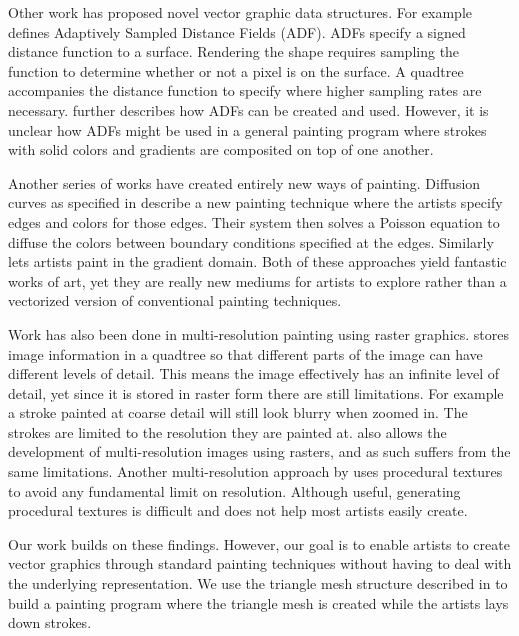 \documentclass[conference]{acmsiggraph}
\begin{document}
Other work has proposed novel vector graphic data structures. For example \cite{Frisken:2000:ASD:344779.344899}
defines Adaptively Sampled Distance Fields (ADF). ADFs specify a signed distance function to a surface.
Rendering the shape requires sampling the function to determine whether or not a pixel is on the surface.
A quadtree accompanies the distance function to specify where higher sampling rates are necessary. \cite{Bremer:2001:VCM}
further describes how ADFs can be created and used. However, it is unclear how ADFs might be used in a general
painting program where strokes with solid colors and gradients are composited on top of one another.

Another series of works have created entirely new ways of painting. Diffusion curves as specified in \cite{Orzan:2008:DCV:1360612.1360691}
describe a new painting technique where the artists specify edges and colors for those edges. Their system
then solves a Poisson equation to diffuse the colors between boundary conditions specified at the edges.
Similarly \cite{McCann:2008:RGP:1360612.1360692}
lets artists paint in the gradient domain. Both of these approaches yield fantastic works of art, yet
they are really new mediums for artists to explore rather than a vectorized version of conventional
painting techniques.

Work has also been done in multi-resolution painting using raster graphics. \cite{Berman:1994:MPC:192161.192181}
stores image information in a quadtree so that different parts of the image can have different levels of detail.
This means the image effectively has an infinite level of detail, yet since it is stored in raster form
there are still limitations. For example a stroke painted at coarse detail will still look blurry when
zoomed in. The strokes are limited to the resolution they are painted at. \cite{Carr:2004:PD:1186562.1015809}
also allows the development of multi-resolution images using rasters, and as such suffers from the
same limitations. Another multi-resolution approach by \cite{Perlin:1995:LPP:218380.218437} uses
procedural textures to avoid any fundamental limit on resolution. Although useful,
generating procedural textures is difficult and does not help most artists easily create.

Our work builds on these findings. However, our goal is to enable artists to create vector
graphics through standard painting techniques without having to deal with the underlying representation.
We use the triangle mesh structure described in \cite{10.1109/TVCG.2012.76} to build a painting program
where the triangle mesh is created while the artists lays down strokes. 
\end{document}
